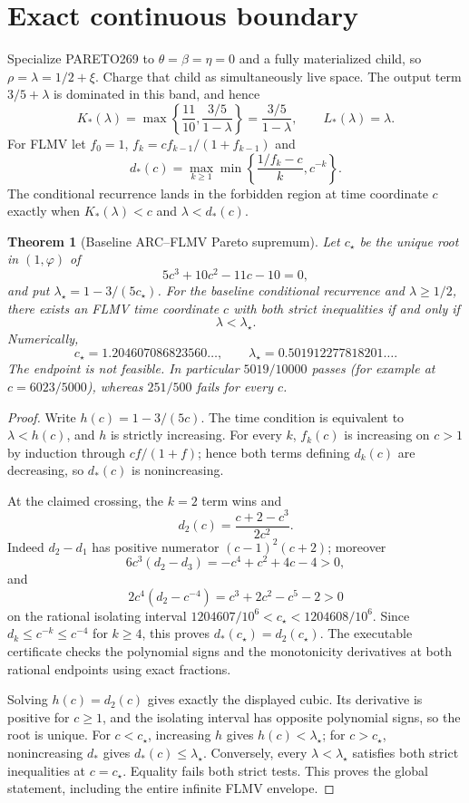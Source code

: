 \documentclass[11pt]{article}
\newtheorem{theorem}{Theorem}
\begin{document}
\section{Exact continuous boundary}
Specialize PARETO269 to $\theta=\beta=\eta=0$ and a fully materialized child,
so $\rho=\lambda=1/2+\xi$.  Charge that child as simultaneously live space.
The output term $3/5+\lambda$ is dominated in this band, and hence
\[
 K_*(\lambda)=\max\left\{\frac{11}{10},
              \frac{3/5}{1-\lambda}\right\}
        =\frac{3/5}{1-\lambda},
 \qquad L_*(\lambda)=\lambda .
\]
For FLMV let $f_0=1$, $f_k=cf_{k-1}/(1+f_{k-1})$ and
\[
 d_*(c)=\max_{k\geq1}\min\left\{
       \frac{1/f_k-c}{k},c^{-k}\right\}.
\]
The conditional recurrence lands in the forbidden region at time coordinate
$c$ exactly when $K_*(\lambda)<c$ and $\lambda<d_*(c)$.

\begin{theorem}[Baseline ARC--FLMV Pareto supremum]
Let $c_\star$ be the unique root in $(1,\varphi)$ of
\[
 5c^3+10c^2-11c-10=0,
\]
and put $\lambda_\star=1-3/(5c_\star)$.  For the baseline conditional
recurrence and $\lambda\geq 1/2$, there exists an FLMV time coordinate $c$
with both strict inequalities if and only if
\[
 \lambda<\lambda_\star.
\]
Numerically,
\[
 c_\star=1.204607086823560\ldots,
 \qquad \lambda_\star=0.501912277818201\ldots .
\]
The endpoint is not feasible.  In particular $5019/10000$ passes (for example
at $c=6023/5000$), whereas $251/500$ fails for every $c$.
\end{theorem}

\begin{proof}
Write $h(c)=1-3/(5c)$.  The time condition is equivalent to
$\lambda<h(c)$, and $h$ is strictly increasing.  For every $k$, $f_k(c)$ is
increasing on $c>1$ by induction through
$cf/(1+f)$; hence both terms defining $d_k(c)$ are decreasing, so
$d_*(c)$ is nonincreasing.

At the claimed crossing, the $k=2$ term wins and
\[
 d_2(c)=\frac{c+2-c^3}{2c^2}.
\]
Indeed $d_2-d_1$ has positive numerator $(c-1)^2(c+2)$; moreover
\[
 6c^3(d_2-d_3)=-c^4+c^2+4c-4>0,
\]
and
\[
 2c^4(d_2-c^{-4})=c^3+2c^2-c^5-2>0
\]
on the rational isolating interval
$1204607/10^6<c_\star<1204608/10^6$.  Since $d_k\leq c^{-k}\leq c^{-4}$
for $k\geq4$, this proves $d_*(c_\star)=d_2(c_\star)$.  The executable
certificate checks the polynomial signs and the monotonicity derivatives at
both rational endpoints using exact fractions.

Solving $h(c)=d_2(c)$ gives exactly the displayed cubic.  Its derivative is
positive for $c\geq1$, and the isolating interval has opposite polynomial
signs, so the root is unique.  For $c<c_\star$, increasing $h$ gives
$h(c)<\lambda_\star$; for $c>c_\star$, nonincreasing $d_*$ gives
$d_*(c)\leq\lambda_\star$.  Conversely, every
$\lambda<\lambda_\star$ satisfies both strict inequalities at
$c=c_\star$.  Equality fails both strict tests.  This proves the global
statement, including the entire infinite FLMV envelope.
\end{proof}
\end{document}
